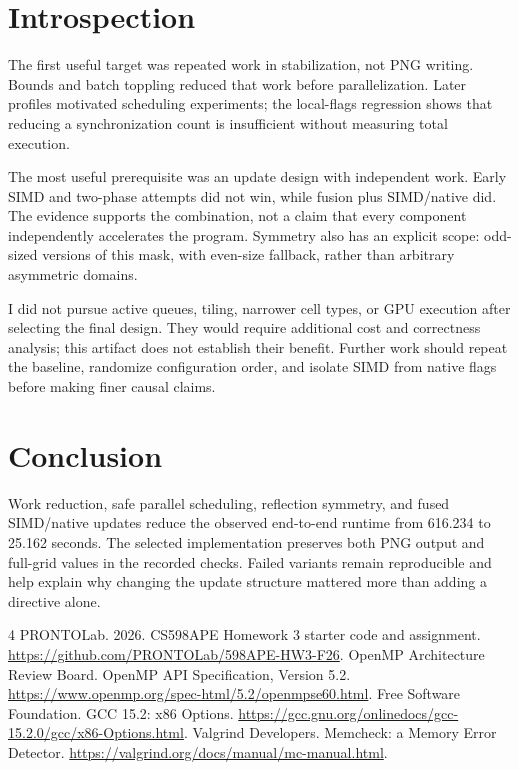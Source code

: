 \documentclass[sigplan,nonacm]{acmart}
\begin{document}
\section{Introspection}
The first useful target was repeated work in stabilization, not PNG writing. Bounds and batch toppling reduced that work before parallelization. Later profiles motivated scheduling experiments; the local-flags regression shows that reducing a synchronization count is insufficient without measuring total execution.

The most useful prerequisite was an update design with independent work. Early SIMD and two-phase attempts did not win, while fusion plus SIMD/native did. The evidence supports the combination, not a claim that every component independently accelerates the program. Symmetry also has an explicit scope: odd-sized versions of this mask, with even-size fallback, rather than arbitrary asymmetric domains.

I did not pursue active queues, tiling, narrower cell types, or GPU execution after selecting the final design. They would require additional cost and correctness analysis; this artifact does not establish their benefit. Further work should repeat the baseline, randomize configuration order, and isolate SIMD from native flags before making finer causal claims.

\section{Conclusion}
Work reduction, safe parallel scheduling, reflection symmetry, and fused SIMD/native updates reduce the observed end-to-end runtime from 616.234 to 25.162 seconds. The selected implementation preserves both PNG output and full-grid values in the recorded checks. Failed variants remain reproducible and help explain why changing the update structure mattered more than adding a directive alone.

\begin{thebibliography}{4}
PRONTOLab. 2026. CS598APE Homework 3 starter code and assignment.
\url{https://github.com/PRONTOLab/598APE-HW3-F26}.
OpenMP Architecture Review Board. OpenMP API Specification, Version 5.2.
\url{https://www.openmp.org/spec-html/5.2/openmpse60.html}.
Free Software Foundation. GCC 15.2: x86 Options.
\url{https://gcc.gnu.org/onlinedocs/gcc-15.2.0/gcc/x86-Options.html}.
Valgrind Developers. Memcheck: a Memory Error Detector.
\url{https://valgrind.org/docs/manual/mc-manual.html}.
\end{thebibliography}
\end{document}
